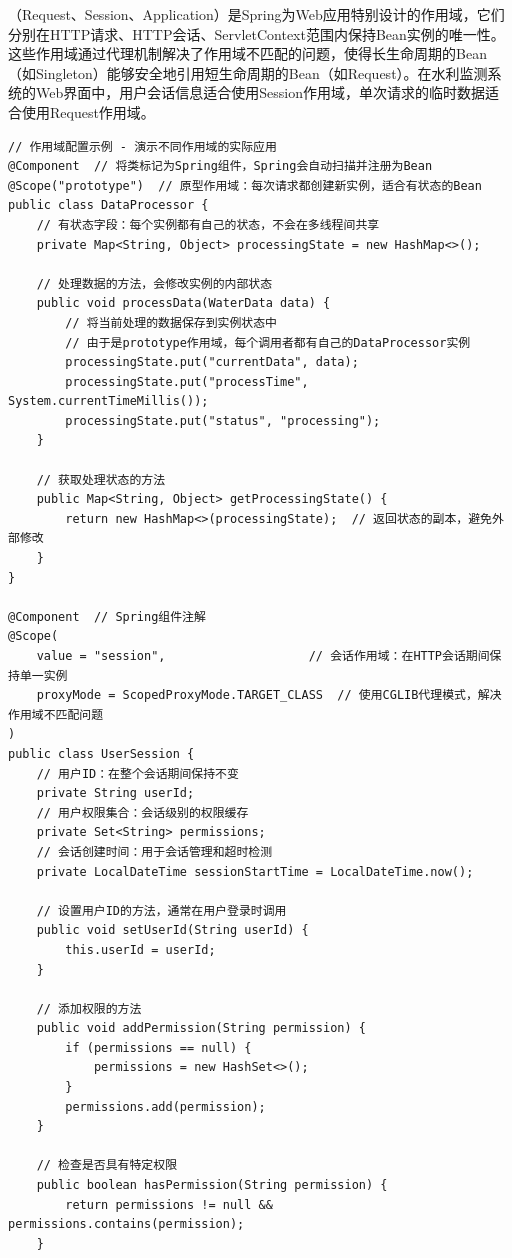 （Request、Session、Application）是Spring为Web应用特别设计的作用域，它们分别在HTTP请求、HTTP会话、ServletContext范围内保持Bean实例的唯一性。这些作用域通过代理机制解决了作用域不匹配的问题，使得长生命周期的Bean（如Singleton）能够安全地引用短生命周期的Bean（如Request）。在水利监测系统的Web界面中，用户会话信息适合使用Session作用域，单次请求的临时数据适合使用Request作用域。

\begin{lstlisting}[style=java]
// 作用域配置示例 - 演示不同作用域的实际应用
@Component  // 将类标记为Spring组件，Spring会自动扫描并注册为Bean
@Scope("prototype")  // 原型作用域：每次请求都创建新实例，适合有状态的Bean
public class DataProcessor {
    // 有状态字段：每个实例都有自己的状态，不会在多线程间共享
    private Map<String, Object> processingState = new HashMap<>();
    
    // 处理数据的方法，会修改实例的内部状态
    public void processData(WaterData data) {
        // 将当前处理的数据保存到实例状态中
        // 由于是prototype作用域，每个调用者都有自己的DataProcessor实例
        processingState.put("currentData", data);
        processingState.put("processTime", System.currentTimeMillis());
        processingState.put("status", "processing");
    }
    
    // 获取处理状态的方法
    public Map<String, Object> getProcessingState() {
        return new HashMap<>(processingState);  // 返回状态的副本，避免外部修改
    }
}

@Component  // Spring组件注解
@Scope(
    value = "session",                    // 会话作用域：在HTTP会话期间保持单一实例
    proxyMode = ScopedProxyMode.TARGET_CLASS  // 使用CGLIB代理模式，解决作用域不匹配问题
)
public class UserSession {
    // 用户ID：在整个会话期间保持不变
    private String userId;
    // 用户权限集合：会话级别的权限缓存
    private Set<String> permissions;
    // 会话创建时间：用于会话管理和超时检测
    private LocalDateTime sessionStartTime = LocalDateTime.now();
    
    // 设置用户ID的方法，通常在用户登录时调用
    public void setUserId(String userId) {
        this.userId = userId;
    }
    
    // 添加权限的方法
    public void addPermission(String permission) {
        if (permissions == null) {
            permissions = new HashSet<>();
        }
        permissions.add(permission);
    }
    
    // 检查是否具有特定权限
    public boolean hasPermission(String permission) {
        return permissions != null && permissions.contains(permission);
    }
    

\end{lstlisting}
